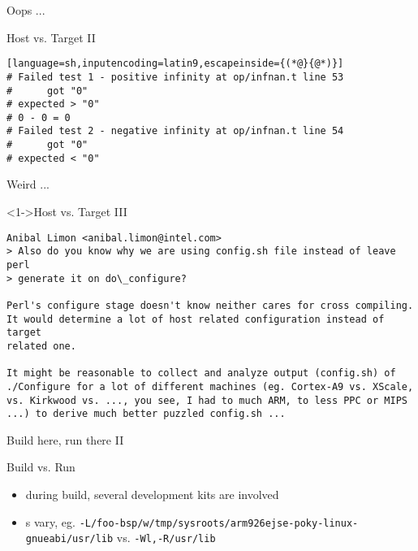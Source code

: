 \documentclass[ngerman,xcolor={table,dvipsnames},smaller,compress,hyperref={bookmarks,colorlinks}]{beamer}%
\newcommand{\variable}[1]{{\color{violet}{\textsf{#1}}}}
\begin{document}
\begin{frame}[fragile]{Oops ...}
\begin{block}{Host vs. Target II}
\scriptsize
\begin{lstlisting}[language=sh,inputencoding=latin9,escapeinside={(*@}{@*)}]
# Failed test 1 - positive infinity at op/infnan.t line 53
#      got "0"
# expected > "0"
# 0 - 0 = 0
# Failed test 2 - negative infinity at op/infnan.t line 54
#      got "0"
# expected < "0"
\end{lstlisting}
\end{block}
\end{frame}

\begin{frame}[fragile]{Weird ...}
\begin{block}<1->{Host vs. Target III}
\scriptsize
\begin{verbatim}
Anibal Limon <anibal.limon@intel.com>
> Also do you know why we are using config.sh file instead of leave perl
> generate it on do\_configure?

Perl's configure stage doesn't know neither cares for cross compiling.
It would determine a lot of host related configuration instead of target
related one.

It might be reasonable to collect and analyze output (config.sh) of
./Configure for a lot of different machines (eg. Cortex-A9 vs. XScale,
vs. Kirkwood vs. ..., you see, I had to much ARM, to less PPC or MIPS
...) to derive much better puzzled config.sh ...
\end{verbatim}
\end{block}
\end{frame}

\begin{frame}[fragile]{Build here, run there II}
\begin{block}{Build vs. Run}
\begin{itemize}
\item during build, several development kits are involved 
\item<3-> \variable{PATH}s vary, eg. \texttt{-L/foo-bsp/w/tmp/sysroots/arm926ejse-poky-linux-gnueabi/usr/lib} vs. \texttt{-Wl,-R/usr/lib}
\end{itemize}
\end{block}
\end{frame}
\end{document}
